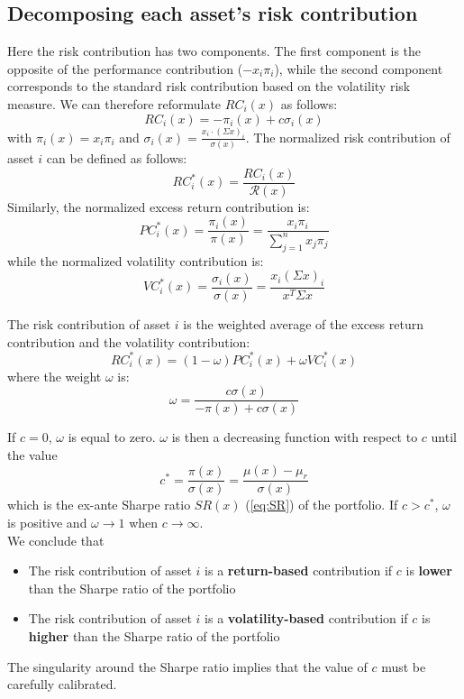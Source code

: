 \subsection{Decomposing each asset's risk contribution}
Here the risk contribution has two components. The first component is the opposite of the performance contribution ($-x_i\pi_i$), while the second component corresponds to the standard risk contribution based on the volatility risk measure. We can therefore reformulate $RC_i(x)$ as follows:
\begin{equation}
RC_i(x) = -\pi_i(x) + c \sigma_i(x)
\end{equation}
with $\pi_i(x) = x_i\pi_i$ and $\sigma_i(x) = \frac{x_i \cdot (\Sigma x)_i}{\sigma(x)}$. The normalized risk contribution of asset $i$ can be defined as follows:
\begin{equation}
RC^*_i(x) = \frac{RC_i(x)}{\mathcal{R}(x)}
\end{equation}
Similarly, the normalized excess return contribution is:
\begin{equation}
PC^*_i(x) = \frac{\pi_i(x)}{\pi(x)} = \frac{x_i \pi_i}{\sum_{j=1}^n x_j \pi_j}
\end{equation}
while the normalized volatility contribution is:
\begin{equation}
VC^*_i(x) = \frac{\sigma_i(x)}{\sigma(x)} = \frac{x_i(\Sigma x)_i}{x^T \Sigma x}
\end{equation}

\begin{theorem}
The risk contribution of asset $i$ is the weighted average of the excess return contribution and the volatility contribution:
\begin{equation}
RC^*_i(x) = (1-\omega)PC^*_i(x) + \omega VC^*_i(x)
\end{equation}
where the weight $\omega$ is:
\begin{equation}
\omega = \frac{c \sigma(x)}{- \pi(x) + c\sigma(x)}
\end{equation}
\end{theorem}
If $c=0$, $\omega$ is equal to zero. $\omega$ is then a decreasing function with respect to $c$ until the value
\begin{equation}
c^* = \frac{\pi(x)}{\sigma (x)} = \frac{\mu(x)-\mu_r}{\sigma(x)}
\end{equation}
which is the ex-ante Sharpe ratio $SR(x)$ (\ref{eq:SR}) of the portfolio. If $c > c^*$, $\omega$ is positive and $\omega \rightarrow 1$ when $c \rightarrow \infty$.\\
We conclude that
\begin{itemize}
\item The risk contribution of asset $i$ is a \textbf{return-based} contribution if $c$ is \textbf{lower} than the Sharpe ratio of the portfolio
\item The risk contribution of asset $i$ is a \textbf{volatility-based} contribution if $c$ is \textbf{higher} than the Sharpe ratio of the portfolio
\end{itemize}
The singularity around the Sharpe ratio implies that the value of $c$ must be carefully calibrated.

